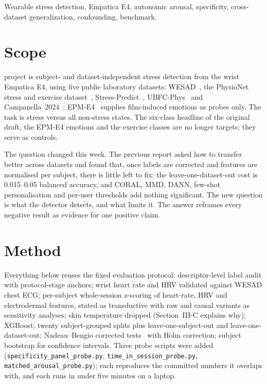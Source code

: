 \documentclass[journal]{IEEEtran}
\begin{document}
\begin{IEEEkeywords}
Wearable stress detection, Empatica E4, autonomic arousal, specificity, cross-dataset generalization, confounding, benchmark.
\end{IEEEkeywords}

\section{Scope}
 project is subject- and dataset-independent stress detection from the wrist Empatica E4, using five public laboratory datasets: WESAD~\cite{schmidt2018wesad}, the PhysioNet stress and exercise dataset~\cite{hongn2025data}, Stress-Predict~\cite{iqbal2022}, UBFC-Phys~\cite{meziati2023} and Campanella~2024~\cite{campanella2024}; EPM-E4~\cite{garcia2020epm} supplies film-induced emotions as probes only. The task is stress versus all non-stress states. The six-class headline of the original draft, the EPM-E4 emotions and the exercise classes are no longer targets; they serve as controls.

The question changed this week. The previous report asked how to transfer better across datasets and found that, once labels are corrected and features are normalised per subject, there is little left to fix: the leave-one-dataset-out cost is 0.015--0.05 balanced accuracy, and CORAL, MMD, DANN, few-shot personalisation and per-user thresholds add nothing significant. The new question is what the detector detects, and what limits it. The answer reframes every negative result as evidence for one positive claim.

\section{Method}
Everything below reuses the fixed evaluation protocol: descriptor-level label audit with protocol-stage anchors; wrist heart rate and HRV validated against WESAD chest ECG; per-subject whole-session z-scoring of heart-rate, HRV and electrodermal features, stated as transductive with raw and causal variants as sensitivity analyses; skin temperature dropped (Section~III-C explains why); XGBoost; twenty subject-grouped splits plus leave-one-subject-out and leave-one-dataset-out; Nadeau--Bengio corrected tests~\cite{nadeau2003} with Holm correction; subject bootstrap for confidence intervals. Three probe scripts were added (\texttt{specificity\_panel\_probe.py}, \texttt{time\_in\_session\_probe.py}, \texttt{matched\_arousal\_probe.py}); each reproduces the committed numbers it overlaps with, and each runs in under five minutes on a laptop.
\end{document}
